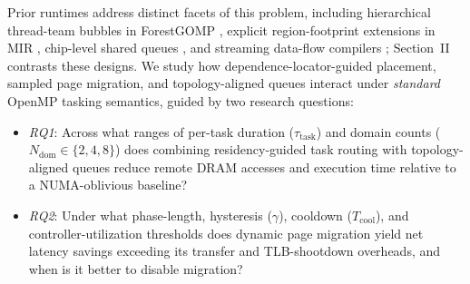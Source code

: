 \documentclass[10pt,twocolumn,letterpaper]{article}
\begin{document}
Prior runtimes address distinct facets of this problem, including hierarchical thread-team bubbles in ForestGOMP \cite{ref12}, explicit region-footprint extensions in MIR \cite{ref13}, chip-level shared queues \cite{ref10}, and streaming data-flow compilers \cite{ref11}; Section~II contrasts these designs. We study how dependence-locator-guided placement, sampled page migration, and topology-aligned queues interact under \emph{standard} OpenMP tasking semantics, guided by two research questions:
\begin{itemize}\setlength{\itemsep}{0pt}\setlength{\parskip}{0pt}\setlength{\topsep}{2pt}
\item \textit{RQ1}: Across what ranges of per-task duration ($\tau_{\mathrm{task}}$) and domain counts ($N_{\mathrm{dom}} \in \{2, 4, 8\}$) does combining residency-guided task routing with topology-aligned queues reduce remote DRAM accesses and execution time relative to a NUMA-oblivious baseline?
\item \textit{RQ2}: Under what phase-length, hysteresis ($\gamma$), cooldown ($T_{\mathrm{cool}}$), and controller-utilization thresholds does dynamic page migration yield net latency savings exceeding its transfer and TLB-shootdown overheads, and when is it better to disable migration?
\end{itemize}
\end{document}
